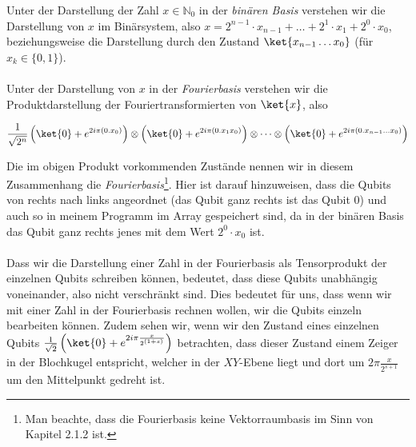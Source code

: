 Unter der Darstellung der Zahl $x \in \mathbb{N}_0$ in der \textit{binären Basis} verstehen wir die Darstellung von $x$ im Binärsystem, also $x = 2^{n - 1}\cdot x_{n - 1} + \dots + 2^1 \cdot x_1 + 2^0 \cdot x_0$, beziehungsweise die Darstellung durch den Zustand $\ket{x_{n - 1}\dots x_0}$ (für $x_k \in \{0, 1\}$).
\paragraph{}
Unter der Darstellung von $x$ in der \textit{Fourierbasis} verstehen wir die Produktdarstellung der Fouriertransformierten von $\ket{x}$, also 

$$\frac{1}{\sqrt{2^n}}\left(\ket{0} + e^{2i\pi(0.x_0)}\right)\otimes\left(\ket{0} + e^{2i\pi(0.x_1x_0)}\right)\otimes \dots \otimes \left(\ket{0} + e^{2i\pi(0.x_{n - 1}\dots x_0)}\right)$$

Die im obigen Produkt vorkommenden Zustände nennen wir in diesem Zusammenhang die \textit{Fourierbasis}\footnote{Man beachte, dass die Fourierbasis keine Vektorraumbasis im Sinn von Kapitel 2.1.2 ist.}. Hier ist darauf hinzuweisen, dass die Qubits von rechts nach links angeordnet (das Qubit ganz rechts ist das Qubit $0$) und auch so in meinem Programm im Array gespeichert sind, da in der binären Basis das Qubit ganz rechts jenes mit dem Wert $2^0 \cdot x_0$ ist.

\paragraph{}

Dass wir die Darstellung einer Zahl in der Fourierbasis als Tensorprodukt der einzelnen Qubits schreiben können, bedeutet, dass diese Qubits unabhängig voneinander, also nicht verschränkt sind. Dies bedeutet für uns, dass wenn wir mit einer Zahl in der Fourierbasis rechnen wollen, wir die Qubits einzeln bearbeiten können. Zudem sehen wir, wenn wir den Zustand eines einzelnen Qubits $\frac{1}{\sqrt{2}}\left(\ket{0} + e^{2i\pi\frac{x}{2^{(1 + s)}}}\right)$ betrachten, dass dieser Zustand einem Zeiger in der Blochkugel entspricht, welcher in der $XY$-Ebene liegt und dort um $2\pi\frac{x}{2^{s + 1}}$ um den Mittelpunkt gedreht ist.


